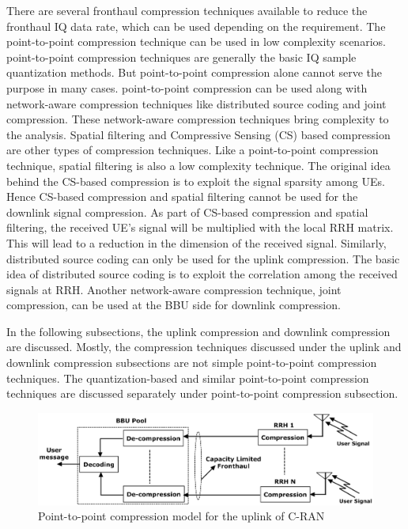\begin{multicols}{2}
There are several fronthaul compression techniques available to reduce the fronthaul IQ data rate, which can be used depending on the requirement. The point-to-point compression technique can be used in low complexity scenarios. point-to-point compression techniques are generally the basic IQ sample quantization methods. But point-to-point compression alone cannot serve the purpose in many cases. point-to-point compression can be used along with network-aware compression techniques like distributed source coding and joint compression. These network-aware compression techniques bring complexity to the analysis. Spatial filtering and Compressive Sensing (CS) based compression are other types of compression techniques. Like a point-to-point compression technique, spatial filtering is also a low complexity technique. The original idea behind the CS-based compression is to exploit the signal sparsity among UEs. Hence CS-based compression and spatial filtering cannot be used for the downlink signal compression. As part of CS-based compression and spatial filtering, the received UE’s signal will be multiplied with the local RRH matrix. This will lead to a reduction in the dimension of the received signal. Similarly, distributed source coding can only be used for the uplink compression. The basic idea of distributed source coding is to exploit the correlation among the received signals at RRH. Another network-aware compression technique, joint compression, can be used at the BBU side for downlink compression.

In the following subsections, the uplink compression and downlink compression are discussed. Mostly, the compression techniques discussed under the uplink and downlink compression subsections are not simple point-to-point compression techniques. The quantization-based and similar point-to-point compression techniques are discussed separately under point-to-point compression subsection.
\end{multicols}

\begin{figure}[H]
\centering
\includegraphics[scale=.58]{src/Figures/chap3/fig04.jpg}
\caption{Point-to-point compression model for the uplink of C-RAN}\label{fig04}
\end{figure}

